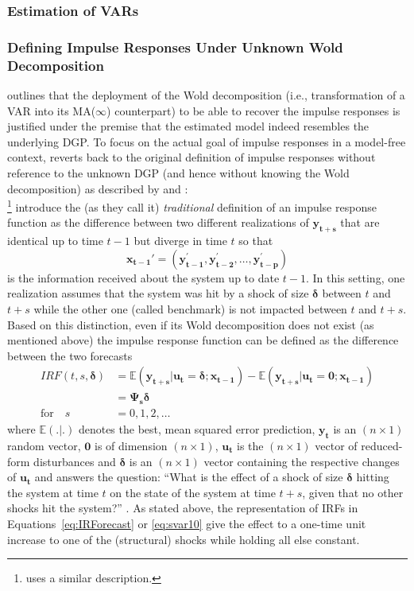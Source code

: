 \documentclass[a4paper,11pt,listof=nochaptergap,oneside,pointednumbers,bibtotoc,bigheadings,liststotoc]{scrbook}
\theoremstyle{mysatz}
\theoremstyle{mydefinition}
\theoremstyle{mybemerkung}
\renewcommand*{\paragraph}[1]{\subsubsection*{#1} \vspace{-3mm}} %
\newcommand{\vect}[1]{\boldsymbol{\mathbf{#1}}}
\begin{document}
\paragraph{Estimation of VARs}


\paragraph{Defining Impulse Responses Under Unknown Wold Decomposition}
\citet{jorda:05} outlines that the deployment of the Wold decomposition (i.e., transformation of a VAR into its MA($\infty$) counterpart) to be able to recover the impulse responses is justified under the premise that the estimated model indeed resembles the underlying DGP. To focus on the actual goal of impulse responses in a model-free context, \citet{jorda:05} reverts back to the original definition of impulse responses without reference to the unknown DGP (and hence without knowing the Wold decomposition) as described by \citet{koopetal:96} and \citet{hamilton:94}:\\
\citet{koopetal:96}\footnote{\citet{hamilton:94} uses a similar description.} introduce the (as they call it) \textit{traditional} definition of an impulse response function as the difference between two different realizations of $\vect{y_{t+s}}$ that are identical up to time $t-1$ but diverge in time $t$ so that 
\begin{equation}
	\vect{x_{t-1}'} = (\vect{y_{t-1}^'}, \vect{y_{t-2}^'}, \dots, \vect{y_{t-p}^'})
\end{equation}
is the information received about the system up to date $t-1$. In this setting, one realization assumes that the system was hit by a shock of size $\vect{\delta}$ between $t$ and $t+s$ while the other one (called benchmark) is not impacted between $t$ and $t+s$. Based on this distinction, even if its Wold decomposition does not exist (as mentioned above) the impulse response function can be defined as the difference between the two forecasts
\begin{equation}\label{eq:IRForecast}
\begin{split}
	IRF(t, s, \vect{\delta}) & = \mathbb{E}(\vect{y_{t+s}}|\vect{u_t}=\vect{\delta}; \vect{x_{t-1}}) - \mathbb{E}(\vect{y_{t+s}}|\vect{u_t}=\vect{0};\vect{x_{t-1}}) \\
	& = \vect{\Psi_s \delta} \\
	\text{for} \quad s & = 0, 1, 2, \dots
\end{split}
\end{equation}
where $\mathbb{E}(.|.)$ denotes the best, mean squared error prediction, $\vect{y_t}$ is an $(n \times 1)$ random vector, $\vect{0}$ is of dimension $(n \times 1)$, $\vect{u_t}$ is the $(n \times 1)$ vector of reduced-form disturbances and $\vect{\delta}$ is an $(n \times 1)$ vector containing the respective changes of $\vect{u_t}$ and answers the question: ``What is the effect of a shock of size $\vect{\delta}$ hitting the system at time $t$ on the state of the system at time $t+s$, given that no other shocks hit the system?'' \citep{koopetal:96}. As stated above, the representation of IRFs in Equations~\ref{eq:IRForecast} or \ref{eq:svar10} give the effect to a one-time unit increase to one of the (structural) shocks while holding all else constant. 
\end{document}
